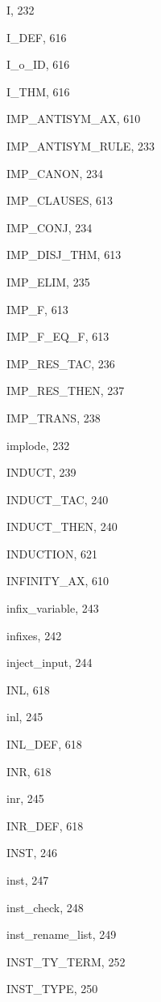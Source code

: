 \begin{theindex}
  \indexspace

  \item {\ptt I}, 232
  \item {\ptt I\_DEF}, 616
  \item {\ptt I\_o\_ID}, 616
  \item {\ptt I\_THM}, 616
  \item {\ptt IMP\_ANTISYM\_AX}, 610
  \item {\ptt IMP\_ANTISYM\_RULE}, 233
  \item {\ptt IMP\_CANON}, 234
  \item {\ptt IMP\_CLAUSES}, 613
  \item {\ptt IMP\_CONJ}, 234
  \item {\ptt IMP\_DISJ\_THM}, 613
  \item {\ptt IMP\_ELIM}, 235
  \item {\ptt IMP\_F}, 613
  \item {\ptt IMP\_F\_EQ\_F}, 613
  \item {\ptt IMP\_RES\_TAC}, 236
  \item {\ptt IMP\_RES\_THEN}, 237
  \item {\ptt IMP\_TRANS}, 238
  \item {\ptt implode}, 232
  \item {\ptt INDUCT}, 239
  \item {\ptt INDUCT\_TAC}, 240
  \item {\ptt INDUCT\_THEN}, 240
  \item {\ptt INDUCTION}, 621
  \item {\ptt INFINITY\_AX}, 610
  \item {\ptt infix\_variable}, 243
  \item {\ptt infixes}, 242
  \item {\ptt inject\_input}, 244
  \item {\ptt INL}, 618
  \item {\ptt inl}, 245
  \item {\ptt INL\_DEF}, 618
  \item {\ptt INR}, 618
  \item {\ptt inr}, 245
  \item {\ptt INR\_DEF}, 618
  \item {\ptt INST}, 246
  \item {\ptt inst}, 247
  \item {\ptt inst\_check}, 248
  \item {\ptt inst\_rename\_list}, 249
  \item {\ptt INST\_TY\_TERM}, 252
  \item {\ptt INST\_TYPE}, 250

\end{theindex}
